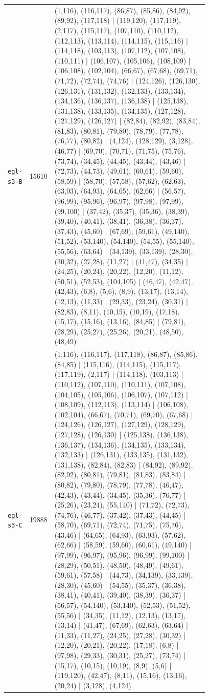 \begin{landscape}
\begin{longtable}{lr>{\tiny\raggedright\arraybackslash}p{0.78\linewidth}}
\texttt{egl-s3-B} & 15610 & (1,116), (116,117), (86,87), (85,86), (84,92), (89,92), (117,118) | (119,120), (117,119), (2,117), (115,117), (107,110), (110,112), (112,113), (113,114), (114,115), (115,116) | (114,118), (103,113), (107,112), (107,108), (110,111) | (106,107), (105,106), (108,109) | (106,108), (102,104), (66,67), (67,68), (69,71), (71,72), (72,74), (74,76) | (124,126), (126,130), (126,131), (131,132), (132,133), (133,134), (134,136), (136,137), (136,138) | (125,138), (131,138), (133,135), (134,135), (127,128), (127,129), (126,127) | (82,84), (82,92), (83,84), (81,83), (80,81), (79,80), (78,79), (77,78), (76,77), (80,82) | (4,124), (128,129), (3,128), (46,77) | (69,70), (70,71), (71,75), (75,76), (73,74), (34,45), (44,45), (43,44), (43,46) | (72,73), (44,73), (49,61), (60,61), (59,60), (58,59) | (58,70), (57,58), (57,62), (62,63), (63,93), (64,93), (64,65), (62,66) | (56,57), (96,99), (95,96), (96,97), (97,98), (97,99), (99,100) | (37,42), (35,37), (35,36), (38,39), (39,40), (40,41), (38,41), (36,38), (36,37), (37,43), (45,60) | (67,69), (59,61), (49,140), (51,52), (53,140), (54,140), (54,55), (55,140), (55,56), (63,64) | (34,139), (33,139), (28,30), (30,32), (27,28), (11,27) | (41,47), (34,35) | (24,25), (20,24), (20,22), (12,20), (11,12), (50,51), (52,53), (104,105) | (46,47), (42,47), (42,43), (6,8), (5,6), (8,9), (13,17), (13,14), (12,13), (11,33) | (29,33), (23,24), (30,31) | (82,83), (8,11), (10,15), (10,19), (17,18), (15,17), (15,16), (13,16), (84,85) | (79,81), (28,29), (25,27), (25,26), (20,21), (48,50), (48,49) \\[2pt]
\texttt{egl-s3-C} & 19888 & (1,116), (116,117), (117,118), (86,87), (85,86), (84,85) | (115,116), (114,115), (115,117), (117,119), (2,117) | (114,118), (103,113) | (110,112), (107,110), (110,111), (107,108), (104,105), (105,106), (106,107), (107,112) | (108,109), (112,113), (113,114) | (106,108), (102,104), (66,67), (70,71), (69,70), (67,68) | (124,126), (126,127), (127,129), (128,129), (127,128), (126,130) | (125,138), (136,138), (136,137), (134,136), (134,135), (133,134), (132,133) | (126,131), (133,135), (131,132), (131,138), (82,84), (82,83) | (84,92), (89,92), (82,92), (80,81), (79,81), (81,83), (83,84) | (80,82), (79,80), (78,79), (77,78), (46,47), (42,43), (43,44), (34,45), (35,36), (76,77) | (25,26), (23,24), (55,140) | (71,72), (72,73), (74,76), (46,77), (37,42), (37,43), (44,45) | (58,70), (69,71), (72,74), (71,75), (75,76), (43,46) | (64,65), (64,93), (63,93), (57,62), (62,66) | (58,59), (59,60), (60,61), (49,140) | (97,99), (96,97), (95,96), (96,99), (99,100) | (28,29), (50,51), (48,50), (48,49), (49,61), (59,61), (57,58) | (44,73), (34,139), (33,139), (28,30), (45,60) | (54,55), (35,37), (36,38), (38,41), (40,41), (39,40), (38,39), (36,37) | (56,57), (54,140), (53,140), (52,53), (51,52), (55,56) | (34,35), (11,12), (12,13), (13,17), (13,14) | (41,47), (67,69), (62,63), (63,64) | (11,33), (11,27), (24,25), (27,28), (30,32) | (12,20), (20,21), (20,22), (17,18), (6,8) | (97,98), (29,33), (30,31), (25,27), (73,74) | (15,17), (10,15), (10,19), (8,9), (5,6) | (119,120), (42,47), (8,11), (15,16), (13,16), (20,24) | (3,128), (4,124) \\[2pt]

\end{longtable}
\end{landscape}
